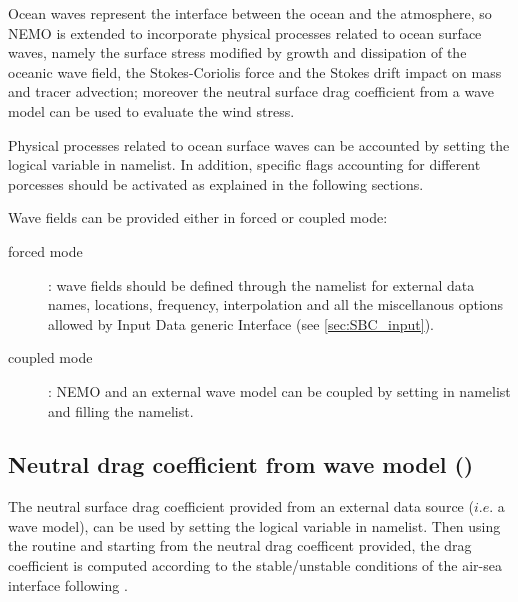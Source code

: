 \documentclass[../tex_main/NEMO_manual]{subfiles}
\begin{document}
Ocean waves represent the interface between the ocean and the atmosphere, so NEMO is extended to incorporate 
physical processes related to ocean surface waves, namely the surface stress modified by growth and 
dissipation of the oceanic wave field, the Stokes-Coriolis force and the Stokes drift impact on mass and 
tracer advection; moreover the neutral surface drag coefficient from a wave model can be used to evaluate 
the wind stress.

Physical processes related to ocean surface waves can be accounted by setting the logical variable 
 in  namelist. In addition, specific flags accounting for 
different porcesses should be activated as explained in the following sections.

Wave fields can be provided either in forced or coupled mode:
\begin{description}
\item[forced mode]: wave fields should be defined through the  namelist 
for external data names, locations, frequency, interpolation and all the miscellanous options allowed by 
Input Data generic Interface (see \autoref{sec:SBC_input}). 
\item[coupled mode]: NEMO and an external wave model can be coupled by setting   
in  namelist and filling the  namelist.
\end{description}


\subsection{Neutral drag coefficient from wave model (\protect{})}
\label{subsec:SBC_wave_cdgw}

The neutral surface drag coefficient provided from an external data source ($i.e.$ a wave model), 
can be used by setting the logical variable   in  namelist. 
Then using the routine  and starting from the neutral drag coefficent provided, 
the drag coefficient is computed according to the stable/unstable conditions of the 
air-sea interface following \citet{Large_Yeager_Rep04}. 


\end{document}

